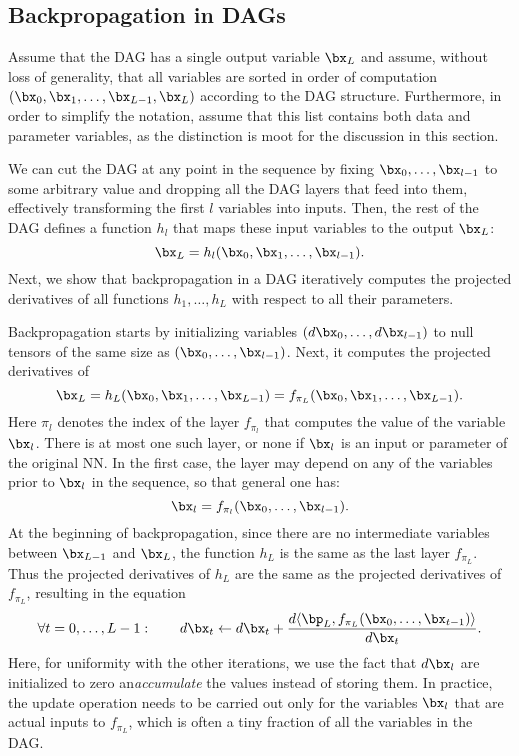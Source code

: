 \subsection{Backpropagation in DAGs}\label{s:dag}

Assume that the DAG has a single output variable $\bx_L$ and assume, without loss of generality, that all variables are sorted in order of computation $(\bx_0,\bx_1,\dots,\bx_{L-1},\bx_L)$ according to the DAG structure. Furthermore, in order to simplify the notation, assume that this list contains both data and parameter variables, as the distinction is moot for the discussion in this section.

We can cut the DAG at any point in the sequence by fixing $\bx_0, \dots, \bx_{l-1}$ to some arbitrary value and dropping all the DAG layers that feed into them, effectively transforming the first $l$ variables into inputs. Then, the rest of the DAG defines a function $h_l$ that maps these input variables to the output $\bx_L$:
\[
 \bx_L = h_l(\bx_0,\bx_1,\dots,\bx_{l-1}).
\]
Next, we show that backpropagation in a DAG iteratively computes the projected derivatives of all functions $h_1,\dots,h_L$ with respect to all their parameters.

Backpropagation starts by initializing variables $(d\bx_{0},\dots,d\bx_{l-1})$ to null tensors of the same size as $(\bx_0,\dots,\bx_{l-1})$. Next, it computes the projected derivatives of
\[
 \bx_L = h_L(\bx_0,\bx_1,\dots,\bx_{L-1}) =
 f_{\pi_L}(\bx_0,\bx_1,\dots,\bx_{L-1}).
\]
Here $\pi_l$ denotes the index of the layer $f_{\pi_l}$ that computes the value of the variable $\bx_l$. There is at most one such layer, or none if $\bx_l$ is an input or parameter of the original NN. In the first case, the layer may depend on any of the variables prior to $\bx_l$ in the sequence, so that general one has:
\[
 \bx_{l} = f_{\pi_l}(\bx_0,\dots,\bx_{l-1}).
\]
	At the beginning of backpropagation, since there are no intermediate variables between $\bx_{L-1}$ and $\bx_L$, the function $h_L$ is the same as the last layer $f_{\pi_L}$. Thus the projected derivatives of $h_L$ are the same as the projected derivatives of $f_{\pi_L}$, resulting in the equation
\[
\forall t=0,\dots,L-1:\qquad
d\bx_{t} \leftarrow d\bx_{t}
+ \frac{d\langle \bp_L, f_{\pi_L}(\bx_0,\dots,\bx_{t-1})\rangle}{d\bx_t}.
\]
Here, for uniformity with the other iterations, we use the fact that $d\bx_l$ are initialized to zero an\emph{accumulate} the values instead of storing them. In practice, the update operation needs to be carried out only for the variables $\bx_l$ that are actual inputs to $f_{\pi_L}$, which is often a tiny fraction of all the variables in the DAG.

